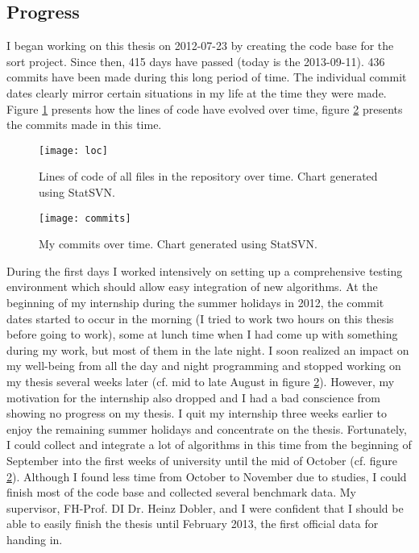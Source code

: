 \subsection{Progress}

I began working on this thesis on 2012-07-23 by creating the code base for the sort project. Since then, 415 days have passed (today is the 2013-09-11). 436 commits have been made during this long period of time. The individual commit dates clearly mirror certain situations in my life at the time they were made. Figure \ref{fig:loc} presents how the lines of code have evolved over time, figure \ref{fig:commits} presents the commits made in this time.

\begin{figure}[h]
\centering
\texttt{[image: loc]}
\caption{Lines of code of all files in the repository over time. Chart generated using StatSVN.}
\label{fig:loc}
\end{figure}

\begin{figure}[h]
\centering
\texttt{[image: commits]}
\caption{My commits over time. Chart generated using StatSVN.}
\label{fig:commits}
\end{figure}

During the first days I worked intensively on setting up a comprehensive testing environment which should allow easy integration of new algorithms. At the beginning of my internship during the summer holidays in 2012, the commit dates started to occur in the morning (I tried to work two hours on this thesis before going to work), some at lunch time when I had come up with something during my work, but most of them in the late night. I soon realized an impact on my well-being from all the day and night programming and stopped working on my thesis several weeks later (cf. mid to late August in figure \ref{fig:commits}). However, my motivation for the internship also dropped and I had a bad conscience from showing no progress on my thesis. I quit my internship three weeks earlier to enjoy the remaining summer holidays and concentrate on the thesis. Fortunately, I could collect and integrate a lot of algorithms in this time from the beginning of September into the first weeks of university until the mid of October (cf. figure \ref{fig:commits}). Although I found less time from October to November due to studies, I could finish most of the code base and collected several benchmark data. My supervisor, FH-Prof. DI Dr. Heinz Dobler, and I were confident that I should be able to easily finish the thesis until February 2013, the first official data for handing in.

